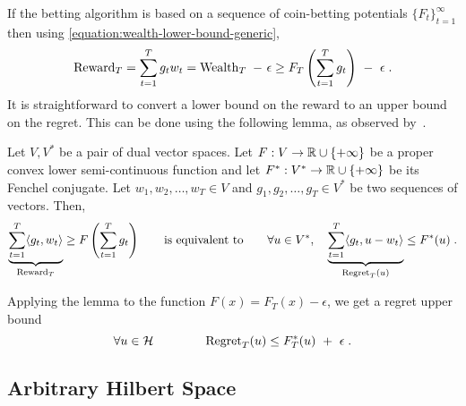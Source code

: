 If the betting algorithm is based on a sequence of coin-betting potentials
$\{F_t\}_{t=1}^\infty$ then using \eqref{equation:wealth-lower-bound-generic},
\begin{equation}
\label{equation:one-dimensional-olo-reward-lower-bound}
\Reward_T
= \sum_{t=1}^T g_t w_t
= \Wealth_T \ - \ \epsilon \ge F_T\left(\sum_{t=1}^T g_t \right) \ - \ \epsilon \; .
\end{equation}
It is straightforward to convert a lower bound on the reward to an upper bound
on the regret. This can be done using the following lemma, as observed
by~\cite{McMahanO14}.
\begin{lemma}
\label{lemma:reward-regret}
Let $V,V^*$ be a pair of dual vector spaces. Let $F:V \to \mathbb{R} \cup \{+\infty\}$
be a proper convex lower semi-continuous function and let $F^*:V^* \to \mathbb{R} \cup
\{+\infty\}$ be its Fenchel conjugate. Let $w_1, w_2, \dots, w_T \in V$ and
$g_1, g_2, \dots, g_T \in V^*$ be two sequences of vectors.  Then,
$$
\underbrace{\sum_{t=1}^T \langle g_t, w_t \rangle}_{\operatorname{Reward}_T} \ge F\left( \sum_{t=1}^T g_t \right)
\qquad \text{is equivalent to} \qquad
\forall u \in V^*, \quad
\underbrace{\sum_{t=1}^T \langle g_t, u - w_t\rangle}_{\operatorname{Regret}_T(u)} \le F^*(u) \; .
$$
\end{lemma}

Applying the lemma to the function $F(x) = F_T(x) - \epsilon$, we get a regret
upper bound
$$
\forall u \in \mathcal{H} \qquad \qquad
\operatorname{Regret}_T(u) \le F_T^*(u) \ + \ \epsilon \; .
$$

\subsection{Arbitrary Hilbert Space}

